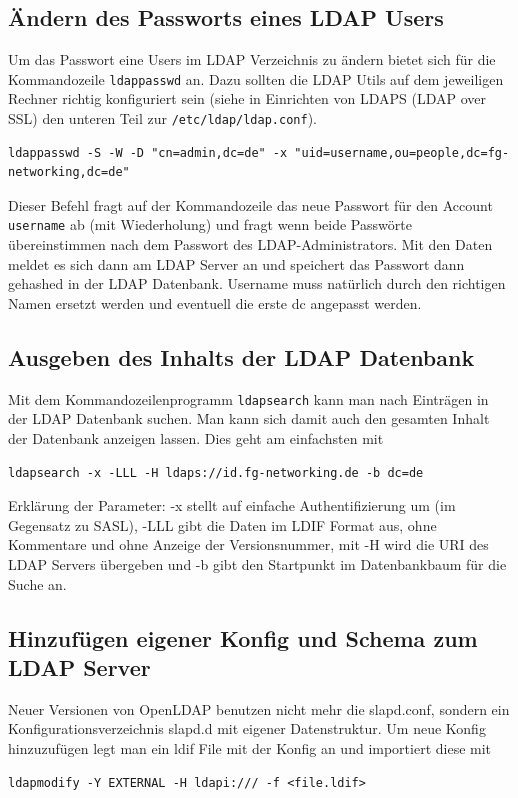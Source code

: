 \documentclass[11pt,a4paper,titlepage=firstiscover,headsepline,bibtotoc]{scrartcl} %
\begin{document}
\subsection{Ändern des Passworts eines LDAP Users}
Um das Passwort eine Users im LDAP Verzeichnis zu ändern bietet sich für die Kommandozeile \texttt{ldappasswd} an. Dazu sollten die LDAP Utils auf dem jeweiligen Rechner richtig konfiguriert sein (siehe in Einrichten von LDAPS (LDAP over SSL) den unteren Teil zur \texttt{/etc/ldap/ldap.conf}).
\begin{lstlisting}
ldappasswd -S -W -D "cn=admin,dc=de" -x "uid=username,ou=people,dc=fg-networking,dc=de"
\end{lstlisting}
Dieser Befehl fragt auf der Kommandozeile das neue Passwort für den Account \texttt{username} ab (mit Wiederholung) und fragt wenn beide Passwörte übereinstimmen nach dem Passwort des LDAP-Administrators. Mit den Daten meldet es sich dann am LDAP Server an und speichert das Passwort dann gehashed in der LDAP Datenbank. Username muss natürlich durch den richtigen Namen ersetzt werden und eventuell die erste dc angepasst werden.

\subsection{Ausgeben des Inhalts der LDAP Datenbank}
Mit dem Kommandozeilenprogramm \texttt{ldapsearch} kann man nach Einträgen in der LDAP Datenbank suchen. Man kann sich damit auch den gesamten Inhalt der Datenbank anzeigen lassen. Dies geht am einfachsten mit
\begin{lstlisting}
ldapsearch -x -LLL -H ldaps://id.fg-networking.de -b dc=de
\end{lstlisting}
Erklärung der Parameter: -x stellt auf einfache Authentifizierung um (im Gegensatz zu SASL), -LLL gibt die Daten im LDIF Format aus, ohne Kommentare und ohne Anzeige der Versionsnummer, mit -H wird die URI des LDAP Servers übergeben und -b gibt den Startpunkt im Datenbankbaum für die Suche an.


\subsection{Hinzufügen eigener Konfig und Schema zum LDAP Server}
Neuer Versionen von OpenLDAP benutzen nicht mehr die slapd.conf, sondern ein Konfigurationsverzeichnis slapd.d mit eigener Datenstruktur.
Um neue Konfig hinzuzufügen legt man ein ldif File mit der Konfig an und importiert diese mit
\begin{lstlisting}
ldapmodify -Y EXTERNAL -H ldapi:/// -f <file.ldif> 
\end{lstlisting}
\end{document}
